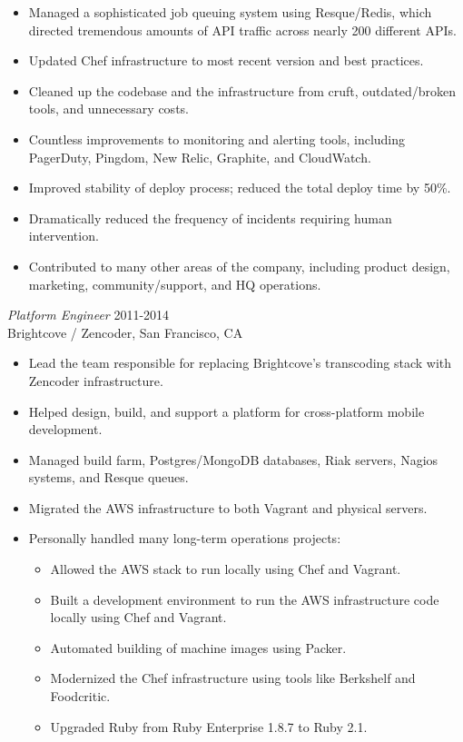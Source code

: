 \documentclass[line,margin]{res}
\begin{document}
\begin{resume}
\begin{itemize}
    \item Managed a sophisticated job queuing system using Resque/Redis, which directed tremendous amounts of API traffic across nearly 200 different APIs.
    \item Updated Chef infrastructure to most recent version and best practices.
    \item Cleaned up the codebase and the infrastructure from cruft, outdated/broken tools, and unnecessary costs.
    \item Countless improvements to monitoring and alerting tools, including PagerDuty, Pingdom, New Relic, Graphite, and CloudWatch.
    \item Improved stability of deploy process; reduced the total deploy time by 50\%.
    \item Dramatically reduced the frequency of incidents requiring human intervention.
    \item Contributed to many other areas of the company, including product design, marketing, community/support, and HQ operations.
  \end{itemize}

  {\sl Platform Engineer}  \hfill 2011-2014 \\
  Brightcove / Zencoder,
  San Francisco, CA
  \begin{itemize}  \itemsep -2pt %
    \item Lead the team responsible for replacing Brightcove's transcoding stack with Zencoder infrastructure.
    \item Helped design, build, and support a platform for cross-platform mobile development.
    \item Managed build farm, Postgres/MongoDB databases, Riak servers, Nagios systems, and Resque queues.
    \item Migrated the AWS infrastructure to both Vagrant and physical servers.
    \item Personally handled many long-term operations projects:

    \vspace{-2.5mm} %
    \begin{itemize}  \itemsep -3pt %
      \item Allowed the AWS stack to run locally using Chef and Vagrant.
      \item Built a development environment to run the AWS infrastructure code locally using Chef and Vagrant.
      \item Automated building of machine images using Packer.
      \item Modernized the Chef infrastructure using tools like Berkshelf and Foodcritic.
      \item Upgraded Ruby from Ruby Enterprise 1.8.7 to Ruby 2.1.
    \end{itemize}
  \end{itemize}


\end{resume}
\end{document}
